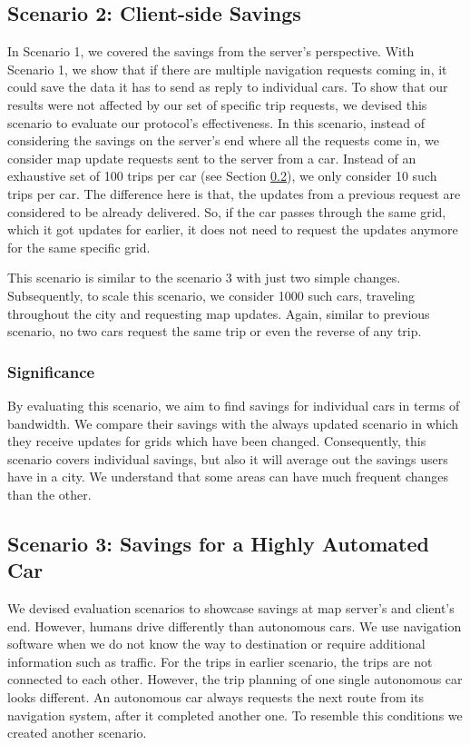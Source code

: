\subsection{Scenario 2: Client-side Savings} \label{10trips}
In Scenario 1, we covered the savings from the server's perspective. With Scenario 1, we show that if there are multiple navigation requests coming in, it could save the data it has to send as reply to individual cars. To show that our results were not affected by our set of specific trip requests, we devised this scenario to evaluate our protocol's effectiveness. In this scenario, instead of considering the savings on the server's end where all the requests come in, we consider map update requests sent to the server from a car. Instead of an exhaustive set of 100 trips per car (see Section \ref{scenario3}), we only consider 10 such trips per car. The difference here is that, the updates from a previous request are considered to be already delivered. So, if the car passes through the same grid, which it got updates for earlier, it does not need to request the updates anymore for the same specific grid.   

This scenario is similar to the scenario 3 with just two simple changes.  Subsequently, to scale this scenario, we consider 1000 such cars, traveling throughout the city and requesting map updates. Again, similar to previous scenario, no two cars request the same trip or even the reverse of any trip.\\

\subsubsection{Significance}
By evaluating this scenario, we aim to find savings for individual cars in terms of bandwidth. We compare their savings with the always updated scenario in which they receive updates for grids which have been changed. Consequently, this scenario covers individual savings, but also it will average out the savings users have in a city. We understand that some areas can have much frequent changes than the other. 


\subsection{Scenario 3: Savings for a Highly Automated Car} \label{scenario3}
We devised evaluation scenarios to showcase savings at map server's and client's end. However, humans drive differently than autonomous cars. We use navigation software when we do not know the way to destination or require additional information such as traffic. For the trips in earlier scenario, the trips are not connected to each other. However, the trip planning of one single autonomous car looks different. An autonomous car always requests the next route from its navigation system, after it completed another one. To resemble this conditions we created another scenario. \\

